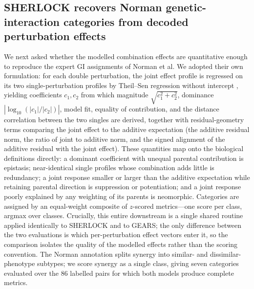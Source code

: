 \subsection{SHERLOCK recovers Norman genetic-interaction categories from decoded perturbation effects}

We next asked whether the modelled combination effects are quantitative enough to reproduce the
expert GI assignments of Norman et al. We adopted their own formulation: for each double
perturbation, the joint effect profile is regressed on its two single-perturbation profiles by
Theil--Sen regression without intercept \cite{sen1968estimates}, yielding coefficients $c_1,c_2$ from
which magnitude $\sqrt{c_1^2+c_2^2}$, dominance $|\log_{10}(|c_1|/|c_2|)|$, model fit, equality of
contribution, and the distance correlation between the two singles are derived, together with
residual-geometry terms comparing the joint effect to the additive expectation (the additive residual
norm, the ratio of joint to additive norm, and the signed alignment of the additive residual with the
joint effect). These quantities map onto the biological definitions directly: a dominant coefficient
with unequal parental contribution is epistasis; near-identical single profiles whose combination
adds little is redundancy; a joint response smaller or larger than the additive expectation while
retaining parental direction is suppression or potentiation; and a joint response poorly explained by
any weighting of its parents is neomorphic. Categories are assigned by an equal-weight composite of
$z$-scored metrics---one score per class, argmax over classes. Crucially, this entire downstream is a
single shared routine applied identically to SHERLOCK and to GEARS; the only difference between the
two evaluations is which per-perturbation effect vectors enter it, so the comparison isolates the
quality of the modelled effects rather than the scoring convention. The Norman annotation splits
synergy into similar- and dissimilar-phenotype subtypes; we score synergy as a single class, giving
seven categories evaluated over the 86 labelled pairs for which both models produce complete metrics.

